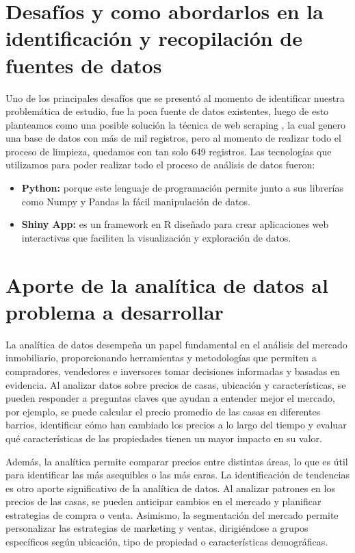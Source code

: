 \documentclass[12pt,a4paper]{article}
\begin{document}
\section{Desafíos y como abordarlos en la identificación y recopilación de fuentes de datos}
Uno de los principales desafíos que se presentó al momento de identificar nuestra problemática de estudio, fue la poca fuente de datos existentes, luego de esto planteamos como una posible solución la técnica de web scraping , la cual genero una base de datos con más de mil registros, pero al momento de realizar todo el proceso de limpieza, quedamos con tan solo 649 registros. 
Las tecnologías que utilizamos para poder realizar todo el proceso de análisis de datos fueron:
\begin{itemize}
	\item [] \textbf{Python:} porque este lenguaje de programación permite junto a sus librerías como  Numpy y Pandas la fácil manipulación de datos.
	\item [] \textbf{Shiny App:} es un framework en R diseñado para crear aplicaciones web interactivas que faciliten la visualización y exploración de datos.
\end{itemize} 

\section{Aporte de la analítica de datos al problema a desarrollar}
La analítica de datos desempeña un papel fundamental en el análisis del mercado inmobiliario, proporcionando herramientas y metodologías que permiten a compradores, vendedores e inversores tomar decisiones informadas y basadas en evidencia. Al analizar datos sobre precios de casas, ubicación y características, se pueden responder a preguntas claves que ayudan a entender mejor el mercado, por ejemplo, se puede calcular el precio promedio de las casas en diferentes barrios, identificar cómo han cambiado los precios a lo largo del tiempo y evaluar qué características de las propiedades tienen un mayor impacto en su valor.

Además, la analítica permite comparar precios entre distintas áreas, lo que es útil para identificar las más asequibles o las más caras. La identificación de tendencias es otro aporte significativo de la analítica de datos. Al analizar patrones en los precios de las casas, se pueden anticipar cambios en el mercado y planificar estrategias de compra o venta. Asimismo, la segmentación del mercado permite personalizar las estrategias de marketing y ventas, dirigiéndose a grupos específicos según ubicación, tipo de propiedad o características demográficas.
\end{document}
